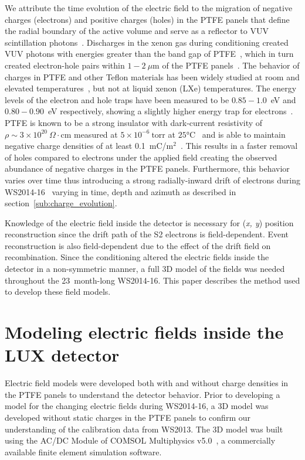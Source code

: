 \documentclass[11pt,a4paper]{article}
\begin{document}
We attribute the time evolution of the electric field to the migration of negative charges (electrons) and positive charges (holes) in the PTFE panels that define the radial boundary of the active volume and serve as a reflector to VUV scintillation photons~\cite{coimbra}. Discharges in the xenon gas during conditioning created VUV photons with energies greater than the band gap of PTFE~\cite{KANIK1996455,Policarpo,ANDRESEN1977371,Munsoo,seki1990electronic}, which in turn created electron-hole pairs within $1-2~\mu$m of the PTFE panels~\cite{Zhang20061995}. The behavior of charges in PTFE and other Teflon materials has been widely studied at room and elevated temperatures~\cite{paulmier2014radiation,green2006ptferho,mellinger2004charge,zhang1991constant}, but not at liquid xenon (LXe) temperatures. The energy levels of the electron and hole traps have been measured to be $0.85-1.0$~eV and $0.80-0.90$~eV respectively, showing a slightly higher energy trap for electrons~\cite{Zhang20061995}. PTFE is known to be a strong insulator with dark-current resistivity of $\rho\sim3\times10^{20}~\Omega\cdot\mathrm{cm}$ measured at $5\times10^{-6}~\mathrm{torr}$ at $\ang{25}\mathrm{C}$~\cite{green2006ptferho} and is able to maintain negative charge densities of at least 0.1~mC/m$^2$~\cite{kressmann1996electrets}. This results in a faster removal of holes compared to electrons under the applied field creating the observed abundance of negative charges in the PTFE panels. Furthermore, this behavior varies over time thus introducing a strong radially-inward drift of electrons during WS2014-16~\cite{Akerib:2016vxi} varying in time, depth and azimuth as described in section~\ref{sub:charge_evolution}.

Knowledge of the electric field inside the detector is necessary for (\textit{x, y}) position reconstruction since the drift path of the S2 electrons is field-dependent. Event reconstruction is also field-dependent due to the effect of the drift field on recombination. Since the conditioning altered the electric fields inside the detector in a non-symmetric manner, a full 3D model of the fields was needed throughout the 23~month-long WS2014-16. This paper describes the method used to develop these field models.

\section{Modeling electric fields inside the LUX detector}\label{Modeling_Efields}

Electric field models were developed both with and without charge densities in the PTFE panels to understand the detector behavior. Prior to developing a model for the changing electric fields during WS2014-16, a 3D model was developed without static charges in the PTFE panels to confirm our understanding of the calibration data from WS2013. The 3D model was built using the AC/DC Module of \textsc{COMSOL} Multiphysics v5.0\textsuperscript{\textregistered}~\cite{comsolRef}, a commercially available finite element simulation software.
\end{document}
